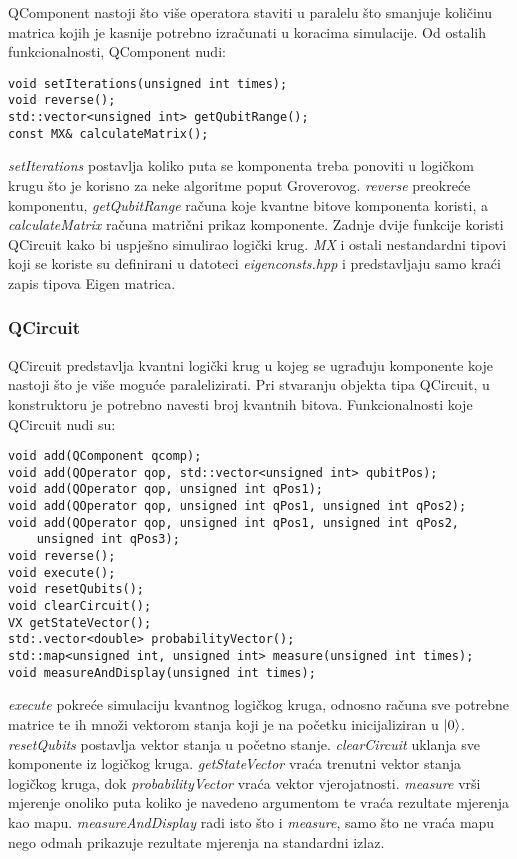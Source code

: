 QComponent nastoji što više operatora staviti u paralelu što smanjuje količinu matrica kojih je kasnije potrebno izračunati u koracima simulacije. Od ostalih funkcionalnosti, QComponent nudi:
\begin{lstlisting}
void setIterations(unsigned int times);
void reverse();
std::vector<unsigned int> getQubitRange();
const MX& calculateMatrix();
\end{lstlisting}
\emph{setIterations} postavlja koliko puta se komponenta treba ponoviti u logičkom krugu što je korisno za neke algoritme poput Groverovog. \emph{reverse} preokreće komponentu, \emph{getQubitRange} računa koje kvantne bitove komponenta koristi, a \emph{calculateMatrix} računa matrični prikaz komponente. Zadnje dvije funkcije koristi QCircuit kako bi uspješno simulirao logički krug. \emph{MX} i ostali nestandardni tipovi koji se koriste su definirani u datoteci \emph{eigenconsts.hpp} i predstavljaju samo kraći zapis tipova Eigen matrica.

\subsubsection{QCircuit}

QCircuit predstavlja kvantni logički krug u kojeg se ugrađuju komponente koje nastoji što je više moguće paralelizirati. Pri stvaranju objekta tipa QCircuit, u konstruktoru je potrebno navesti broj kvantnih bitova. Funkcionalnosti koje QCircuit nudi su:
\begin{lstlisting}
void add(QComponent qcomp);
void add(QOperator qop, std::vector<unsigned int> qubitPos);
void add(QOperator qop, unsigned int qPos1);
void add(QOperator qop, unsigned int qPos1, unsigned int qPos2);
void add(QOperator qop, unsigned int qPos1, unsigned int qPos2,
	unsigned int qPos3);
void reverse();
void execute();
void resetQubits();
void clearCircuit();
VX getStateVector();
std:.vector<double> probabilityVector();
std::map<unsigned int, unsigned int> measure(unsigned int times);
void measureAndDisplay(unsigned int times);
\end{lstlisting}
\emph{execute} pokreće simulaciju kvantnog logičkog kruga, odnosno računa sve potrebne matrice te ih množi vektorom stanja koji je na početku inicijaliziran u $\ket{0}$. \emph{resetQubits} postavlja vektor stanja u početno stanje. \emph{clearCircuit} uklanja sve komponente iz logičkog kruga. \emph{getStateVector} vraća trenutni vektor stanja logičkog kruga, dok \emph{probabilityVector} vraća vektor vjerojatnosti. \emph{measure} vrši mjerenje onoliko puta koliko je navedeno argumentom te vraća rezultate mjerenja kao mapu. \emph{measureAndDisplay} radi isto što i \emph{measure}, samo što ne vraća mapu nego odmah prikazuje rezultate mjerenja na standardni izlaz.

